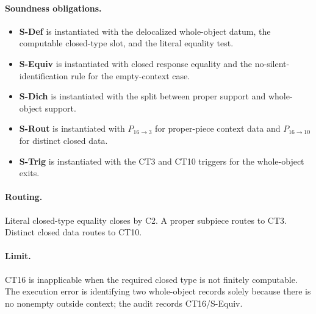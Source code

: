 \documentclass[
  11pt,
]{article}
\providecommand{\tightlist}{%
  \setlength{\itemsep}{0pt}\setlength{\parskip}{0pt}}
\theoremstyle{definition}
\newcommand{\ctpar}[1]{\paragraph{#1.}}
\begin{document}
\ctpar{Soundness obligations}
\begin{itemize}
\tightlist
\item \textbf{S-Def} is instantiated with the delocalized whole-object datum, the computable closed-type slot, and the literal equality test.
\item \textbf{S-Equiv} is instantiated with closed response equality and the no-silent-identification rule for the empty-context case.
\item \textbf{S-Dich} is instantiated with the split between proper support and whole-object support.
\item \textbf{S-Rout} is instantiated with \(P_{16\to3}\) for proper-piece context data and \(P_{16\to10}\) for distinct closed data.
\item \textbf{S-Trig} is instantiated with the CT3 and CT10 triggers for the whole-object exits.
\end{itemize}

\ctpar{Routing}
Literal closed-type equality closes by C2.  A proper subpiece routes to
CT3.  Distinct closed data routes to CT10.

\ctpar{Limit}
CT16 is inapplicable when the required closed type is not finitely
computable. The execution error is identifying two whole-object records
solely because there is no nonempty outside context; the audit records
CT16/S-Equiv.
\end{document}
